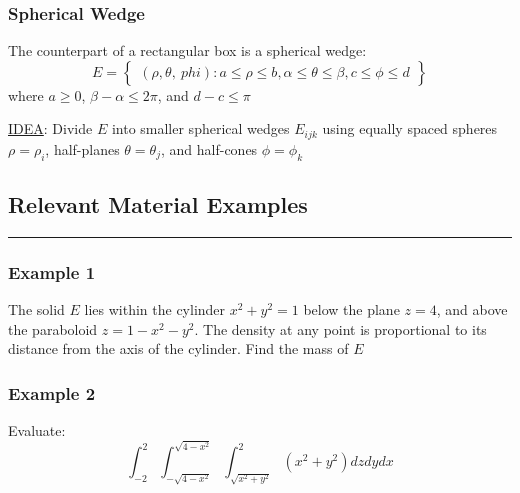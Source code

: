 \documentclass[12pt]{article}
\begin{document}
\subsubsection{Spherical Wedge}
The counterpart of a rectangular box is a spherical wedge:
\[
	E = \begin{Bmatrix}
		(\rho, \theta, \ phi): a \leq \rho \leq b, \alpha \leq \theta \leq \beta, c \leq \phi \leq d
	\end{Bmatrix}
\]
 where \(a \geq 0\), \(\beta - \alpha \leq 2\pi\), and \(d - c \leq \pi\)

\underline{IDEA}: Divide \(E\) into smaller spherical wedges \(E_{ijk}\) using equally spaced spheres \(\rho = \rho_i\), half-planes \(\theta = \theta_j\), and half-cones \(\phi = \phi_k\)
\subsection{Relevant Material Examples}
\hrule
\subsubsection{Example 1}
The solid \(E\) lies within the cylinder \(x^{2} + y^{2} = 1\) below the plane \(z = 4\), and above the paraboloid \(z = 1 - x^{2} - y^{2}\). The density at any point is proportional to its distance from the axis of the cylinder. Find the mass of \(E\)

\subsubsection{Example 2 }
Evaluate: 
\[
	\int_{-2}^{2} \int_{-\sqrt{4-x^2}}^{\sqrt{4-x^2}} \int_{\sqrt{x^{2} + y^{2}}}^{2} (x^{2}+y^{2})dzdydx
\]
\end{document}
